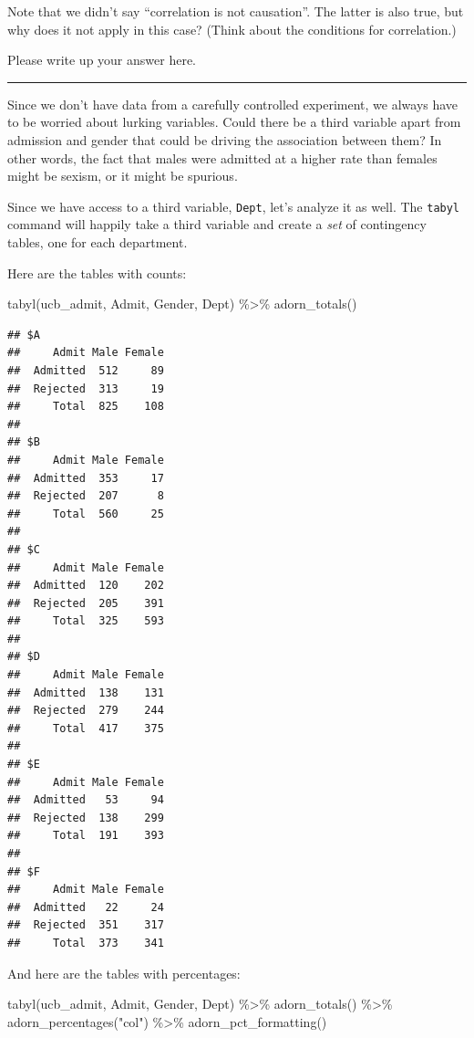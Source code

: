 \documentclass[
]{book}
\newenvironment{Shaded}{\begin{snugshade}}{\end{snugshade}}
\newcommand{\FunctionTok}[1]{\textcolor[rgb]{0.00,0.00,0.00}{#1}}
\newcommand{\NormalTok}[1]{#1}
\newcommand{\SpecialCharTok}[1]{\textcolor[rgb]{0.00,0.00,0.00}{#1}}
\newcommand{\StringTok}[1]{\textcolor[rgb]{0.31,0.60,0.02}{#1}}
\begin{document}
Note that we didn't say ``correlation is not causation''. The latter is also true, but why does it not apply in this case? (Think about the conditions for correlation.)

Please write up your answer here.

\begin{center}\rule{0.5\linewidth}{0.5pt}\end{center}

Since we don't have data from a carefully controlled experiment, we always have to be worried about lurking variables. Could there be a third variable apart from admission and gender that could be driving the association between them? In other words, the fact that males were admitted at a higher rate than females might be sexism, or it might be spurious.

Since we have access to a third variable, \texttt{Dept}, let's analyze it as well. The \texttt{tabyl} command will happily take a third variable and create a \emph{set} of contingency tables, one for each department.

Here are the tables with counts:

\begin{Shaded}
\begin{Highlighting}[]
\FunctionTok{tabyl}\NormalTok{(ucb\_admit, Admit, Gender, Dept) }\SpecialCharTok{\%\textgreater{}\%}
    \FunctionTok{adorn\_totals}\NormalTok{()}
\end{Highlighting}
\end{Shaded}

\begin{verbatim}
## $A
##     Admit Male Female
##  Admitted  512     89
##  Rejected  313     19
##     Total  825    108
## 
## $B
##     Admit Male Female
##  Admitted  353     17
##  Rejected  207      8
##     Total  560     25
## 
## $C
##     Admit Male Female
##  Admitted  120    202
##  Rejected  205    391
##     Total  325    593
## 
## $D
##     Admit Male Female
##  Admitted  138    131
##  Rejected  279    244
##     Total  417    375
## 
## $E
##     Admit Male Female
##  Admitted   53     94
##  Rejected  138    299
##     Total  191    393
## 
## $F
##     Admit Male Female
##  Admitted   22     24
##  Rejected  351    317
##     Total  373    341
\end{verbatim}

And here are the tables with percentages:

\begin{Shaded}
\begin{Highlighting}[]
\FunctionTok{tabyl}\NormalTok{(ucb\_admit, Admit, Gender, Dept) }\SpecialCharTok{\%\textgreater{}\%}
    \FunctionTok{adorn\_totals}\NormalTok{() }\SpecialCharTok{\%\textgreater{}\%}
    \FunctionTok{adorn\_percentages}\NormalTok{(}\StringTok{"col"}\NormalTok{) }\SpecialCharTok{\%\textgreater{}\%}
    \FunctionTok{adorn\_pct\_formatting}\NormalTok{()}
\end{Highlighting}
\end{Shaded}
\end{document}
